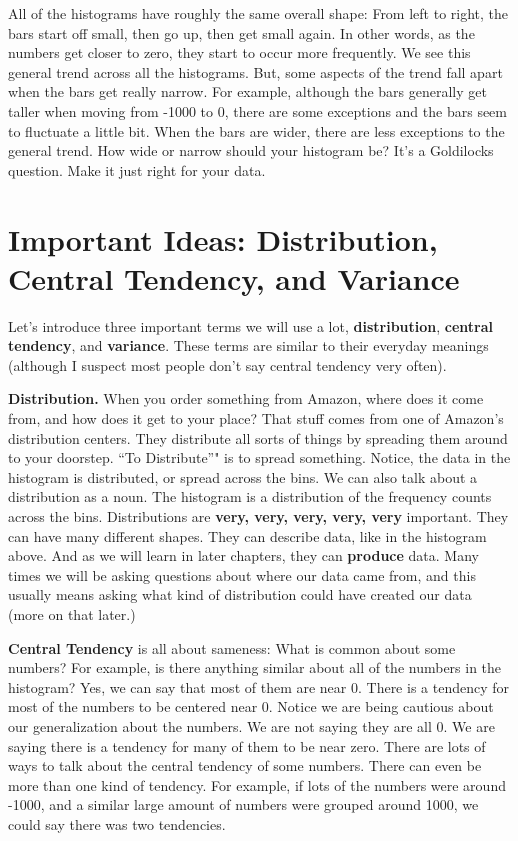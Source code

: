 \documentclass[]{book}
\begin{document}
All of the histograms have roughly the same overall shape: From left to right, the bars start off small, then go up, then get small again. In other words, as the numbers get closer to zero, they start to occur more frequently. We see this general trend across all the histograms. But, some aspects of the trend fall apart when the bars get really narrow. For example, although the bars generally get taller when moving from -1000 to 0, there are some exceptions and the bars seem to fluctuate a little bit. When the bars are wider, there are less exceptions to the general trend. How wide or narrow should your histogram be? It's a Goldilocks question. Make it just right for your data.

\hypertarget{important-ideas-distribution-central-tendency-and-variance}{%
\section{Important Ideas: Distribution, Central Tendency, and Variance}\label{important-ideas-distribution-central-tendency-and-variance}}

Let's introduce three important terms we will use a lot, \textbf{distribution}, \textbf{central tendency}, and \textbf{variance}. These terms are similar to their everyday meanings (although I suspect most people don't say central tendency very often).

\textbf{Distribution.} When you order something from Amazon, where does it come from, and how does it get to your place? That stuff comes from one of Amazon's distribution centers. They distribute all sorts of things by spreading them around to your doorstep. ``To Distribute''" is to spread something. Notice, the data in the histogram is distributed, or spread across the bins. We can also talk about a distribution as a noun. The histogram is a distribution of the frequency counts across the bins. Distributions are \textbf{very, very, very, very, very} important. They can have many different shapes. They can describe data, like in the histogram above. And as we will learn in later chapters, they can \textbf{produce} data. Many times we will be asking questions about where our data came from, and this usually means asking what kind of distribution could have created our data (more on that later.)

\textbf{Central Tendency} is all about sameness: What is common about some numbers? For example, is there anything similar about all of the numbers in the histogram? Yes, we can say that most of them are near 0. There is a tendency for most of the numbers to be centered near 0. Notice we are being cautious about our generalization about the numbers. We are not saying they are all 0. We are saying there is a tendency for many of them to be near zero. There are lots of ways to talk about the central tendency of some numbers. There can even be more than one kind of tendency. For example, if lots of the numbers were around -1000, and a similar large amount of numbers were grouped around 1000, we could say there was two tendencies.
\end{document}
